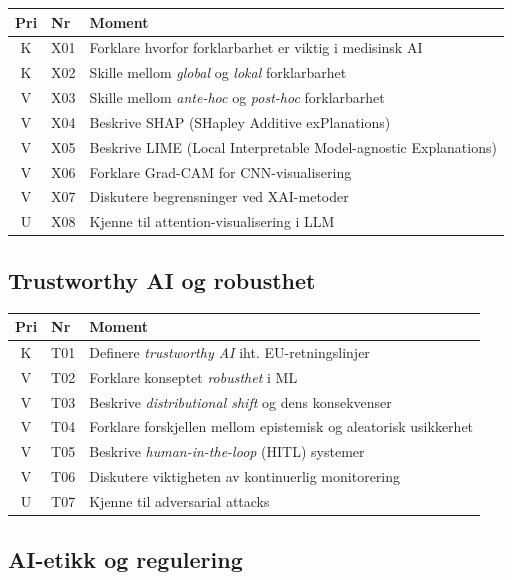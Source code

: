\documentclass[11pt,a4paper]{article}
\begin{document}
\begin{longtable}{@{}clp{9cm}@{}}
\toprule
\textbf{Pri} & \textbf{Nr} & \textbf{Moment} \\
\midrule
\endfirsthead
\midrule
\endhead
\midrule
\endfoot
\bottomrule
\endlastfoot
K & X01 & Forklare hvorfor forklarbarhet er viktig i medisinsk AI \\
K & X02 & Skille mellom \emph{global} og \emph{lokal} forklarbarhet \\
V & X03 & Skille mellom \emph{ante-hoc} og \emph{post-hoc} forklarbarhet \\
V & X04 & Beskrive SHAP (SHapley Additive exPlanations) \\
V & X05 & Beskrive LIME (Local Interpretable Model-agnostic Explanations) \\
V & X06 & Forklare Grad-CAM for CNN-visualisering \\
V & X07 & Diskutere begrensninger ved XAI-metoder \\
U & X08 & Kjenne til attention-visualisering i LLM \\
\end{longtable}

\subsection{Trustworthy AI og robusthet}

\begin{longtable}{@{}clp{9cm}@{}}
\toprule
\textbf{Pri} & \textbf{Nr} & \textbf{Moment} \\
\midrule
\endfirsthead
\midrule
\endhead
\midrule
\endfoot
\bottomrule
\endlastfoot
K & T01 & Definere \emph{trustworthy AI} iht. EU-retningslinjer \\
V & T02 & Forklare konseptet \emph{robusthet} i ML \\
V & T03 & Beskrive \emph{distributional shift} og dens konsekvenser \\
V & T04 & Forklare forskjellen mellom epistemisk og aleatorisk usikkerhet \\
V & T05 & Beskrive \emph{human-in-the-loop} (HITL) systemer \\
V & T06 & Diskutere viktigheten av kontinuerlig monitorering \\
U & T07 & Kjenne til adversarial attacks \\
\end{longtable}

\subsection{AI-etikk og regulering}
\end{document}
